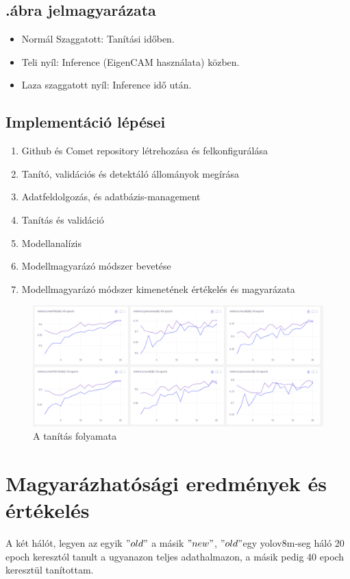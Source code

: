 \documentclass[12pt,oneside,a4paper]{article}
\newcommand{\newsection}[1]{\clearpage\section{#1}}\label{makro}
\theoremstyle{remark}
\newcommand{\oldh}{\( "old" \)}\label{makro2}
\newcommand{\newh}{\( "new" \)}
\begin{document}
\subsection{.ábra jelmagyarázata}\label{subsec:aref{fig:flowchart}-jelmagyarazata}
\begin{itemize}\label{itemize}
        \item Normál Szaggatott: Tanítási időben.
        \item Teli nyíl: Inference (EigenCAM használata) közben.\label{Inference}
        \item Laza szaggatott nyíl: Inference idő után.
    \end{itemize}
\subsection{Implementáció lépései}\label{subsec:impelemntacio}
\begin{enumerate}
        \item Github és Comet repository létrehozása és felkonfigurálása
        \item Tanító, validációs és detektáló állományok megírása
        \item Adatfeldolgozás, és adatbázis-management
        \item Tanítás és validáció
        \item Modellanalízis
        \item Modellmagyarázó módszer bevetése
        \item Modellmagyarázó módszer kimenetének értékelés és magyarázata
\end{enumerate}
\begin{figure}[ht]
    \centering
    \includegraphics[width=1\linewidth]{modelltanitas}
    \caption{A tanítás folyamata}
    \label{fig:tanitas}
\end{figure}

\newsection{Magyarázhatósági eredmények és értékelés}\label{sec:magyarazhatosagi-eredmenyek-es-ertekeles}
    A két hálót, legyen az egyik \oldh\label{makrohasznalat} a másik \newh, \oldh egy yolov8m-seg háló 20
    \gls{epoch} keresztól tanult a ugyanazon teljes adathalmazon, a másik pedig 40 \gls{epoch} keresztül tanítottam.
\end{document}
